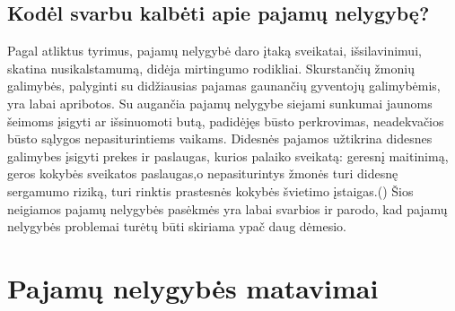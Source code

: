 \documentclass[12pt,a4paper,titlepage]{article}
\begin{document}
\subsection{Kodėl svarbu kalbėti apie pajamų nelygybę?}
Pagal atliktus tyrimus, pajamų nelygybė daro įtaką sveikatai, išsilavinimui, skatina nusikalstamumą, didėja mirtingumo rodikliai. Skurstančių žmonių galimybės, palyginti su didžiausias pajamas gaunančių gyventojų galimybėmis, yra labai apribotos. Su augančia pajamų nelygybe siejami sunkumai jaunoms šeimoms įsigyti ar išsinuomoti butą, padidėjęs būsto perkrovimas, neadekvačios būsto sąlygos nepasiturintiems vaikams. Didesnės pajamos užtikrina didesnes galimybes įsigyti prekes ir paslaugas, kurios palaiko sveikatą: geresnį maitinimą, geros kokybės sveikatos paslaugas,o nepasiturintys žmonės turi didesnę sergamumo riziką, turi rinktis prastesnės kokybės švietimo įstaigas.(\cite{skuvciene2008pajamku}) Šios neigiamos pajamų nelygybės pasėkmės yra labai svarbios ir parodo, kad pajamų nelygybės problemai turėtų būti skiriama ypač daug dėmesio. 
\section{Pajamų nelygybės matavimai}
\end{document}
